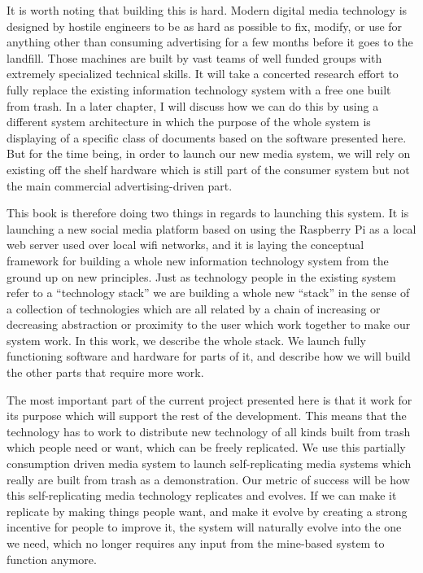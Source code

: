 It is worth noting that building this is hard. Modern digital media technology is designed by hostile engineers to be as hard as possible to fix, modify, or use for anything other than consuming advertising for a few months before it goes to the landfill.  Those machines are built by vast teams of well funded groups with extremely specialized technical skills.  It will take a concerted research effort to fully replace the existing information technology system with a free one built from trash.  In a later chapter, I will discuss how we can do this by using a different system architecture in which the purpose of the whole system is displaying of a specific class of documents based on the software presented here.   But for the time being, in order to launch our new media system, we will rely on existing off the shelf hardware which is still part of the consumer system but not the main commercial advertising-driven part.  

This book is therefore doing two things in regards to launching this system.  It is launching a new social media platform based on using the Raspberry Pi as a local web server used over local wifi networks, and it is laying the conceptual framework for building a whole new information technology system from the ground up on new principles.  Just as technology people in the existing system refer to a ``technology stack'' we are building a whole new ``stack'' in the sense of a collection of technologies which are all related by a chain of increasing or decreasing abstraction or proximity to the user which work together to make our system work.  In this work, we describe the whole stack.  We launch fully functioning software and hardware for parts of it, and describe how we will build the other parts that require more work.  

The most important part of the current project presented here is that it work for its purpose which will support the rest of the development.   This means that the technology has to work to distribute new technology of all kinds built from trash which people need or want, which can be freely replicated.  We use this partially consumption driven media system to launch self-replicating media systems which really are built from trash as a demonstration.  Our metric of success will be how this self-replicating media technology replicates and evolves.  If we can make it replicate by making things people want, and make it evolve by creating a strong incentive for people to improve it, the system will naturally evolve into the one we need, which no longer requires any input from the mine-based system to function anymore.  

